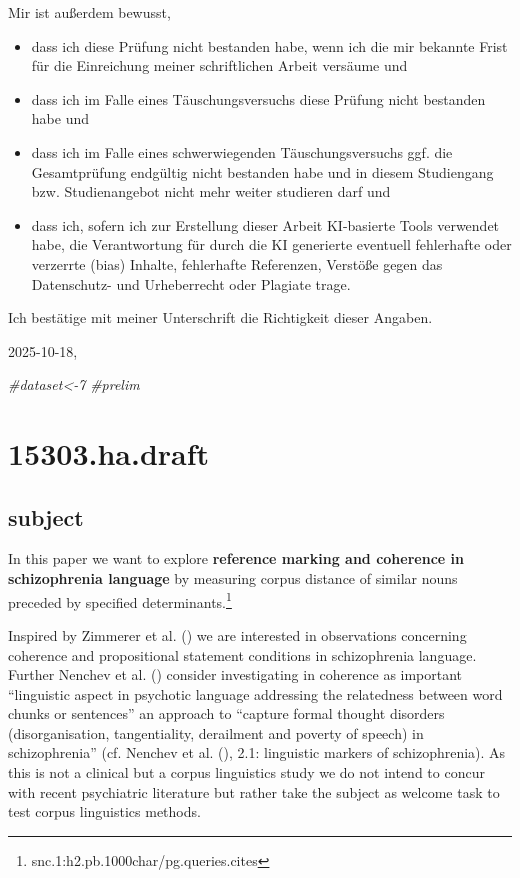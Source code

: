 \documentclass[
  12pt,
  oneside]{book}
\newenvironment{Shaded}{\begin{snugshade}}{\end{snugshade}}
\newcommand{\CommentTok}[1]{\textcolor[rgb]{0.56,0.35,0.01}{\textit{#1}}}
\providecommand{\tightlist}{%
  \setlength{\itemsep}{0pt}\setlength{\parskip}{0pt}}
\begin{document}
Mir ist außerdem bewusst,

\begin{itemize}
\tightlist
\item
  dass ich diese Prüfung nicht bestanden habe, wenn ich die mir bekannte Frist für die Einreichung meiner schriftlichen Arbeit versäume und
\item
  dass ich im Falle eines Täuschungsversuchs diese Prüfung nicht bestanden habe und
\item
  dass ich im Falle eines schwerwiegenden Täuschungsversuchs ggf. die Gesamtprüfung endgültig nicht bestanden habe und in diesem Studiengang bzw. Studienangebot nicht mehr weiter studieren darf und
\item
  dass ich, sofern ich zur Erstellung dieser Arbeit KI-basierte Tools verwendet habe, die Verantwortung für durch die KI generierte eventuell fehlerhafte oder verzerrte (bias) Inhalte, fehlerhafte Referenzen, Verstöße gegen das Datenschutz- und Urheberrecht oder Plagiate trage.
\end{itemize}

Ich bestätige mit meiner Unterschrift die Richtigkeit dieser Angaben.

2025-10-18,

\clearpage

\begin{Shaded}
\begin{Highlighting}[]
\CommentTok{\#dataset\textless{}{-}7}
\CommentTok{\#prelim}
\end{Highlighting}
\end{Shaded}

\chapter{15303.ha.draft}\label{ha.draft}

\section{subject}\label{subject}

In this paper we want to explore \textbf{reference marking and coherence in schizophrenia language} by measuring corpus distance of similar nouns preceded by specified determinants.\footnote{snc.1:h2.pb.1000char/pg.queries.cites}

Inspired by Zimmerer et al. () we are interested in observations concerning coherence and propositional statement conditions in schizophrenia language. Further Nenchev et al. () consider investigating in coherence as important ``linguistic aspect in psychotic language addressing the relatedness between word chunks or sentences'' an approach to ``capture formal thought disorders (disorganisation, tangentiality, derailment and poverty of speech) in schizophrenia'' (cf. Nenchev et al. (), 2.1: linguistic markers of schizophrenia). As this is not a clinical but a corpus linguistics study we do not intend to concur with recent psychiatric literature but rather take the subject as welcome task to test corpus linguistics methods.
\end{document}
